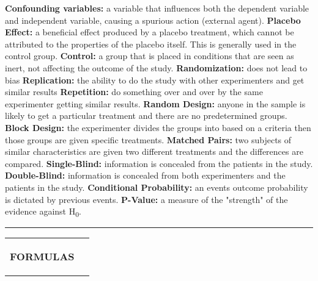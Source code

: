 \documentclass[6pt]{article}
\newcommand{\HL}{\par\noindent\rule{\textwidth}{0.4pt}}
\begin{document}
\begin{footnotesize}
\textbf{Confounding variables:} a variable that influences both the dependent variable and independent variable, causing a spurious action (external agent).
\textbf{Placebo Effect:} a beneficial effect produced by a placebo treatment, which cannot be attributed to the properties of the placebo itself. This is generally used in the control group.
\textbf{Control:} a group that is placed in conditions that are seen as inert, not affecting the outcome of the study.
\textbf{Randomization:} does not lead to bias
\textbf{Replication:} the ability to do the study with other experimenters and get similar results
\textbf{Repetition:} do something over and over by the same experimenter getting similar results.
\textbf{Random Design:} anyone in the sample is likely to get a particular treatment and there are no predetermined groups.
\textbf{Block Design:} the experimenter divides the groups into based on a criteria then those groups are given specific treatments.
\textbf{Matched Pairs:} two subjects of similar characteristics are given two different treatments and the differences are compared.
\textbf{Single-Blind:} information is concealed from the patients in the study.
\textbf{Double-Blind:} information is  concealed from both experimenters and the patients in the study.
\textbf{Conditional Probability:} an events outcome probability is dictated by previous events.
\textbf{P-Value:} a measure of the "strength" of the evidence against H\textsubscript{0}.

\HL

\begin{tabular}{l | l}

\parbox{0.5\textwidth}{

\begin{flushleft}
\textbf{FORMULAS}
\end{flushleft}

\begin{itemize}


\end{itemize}}
\end{tabular}
\end{footnotesize}
\end{document}
